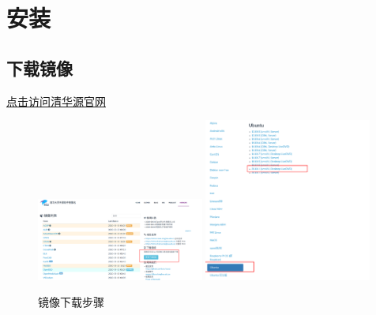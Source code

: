 \setcounter{page}{1} %
\chapter{安装}
\section{下载镜像} 
\href{https://mirrors.tuna.tsinghua.edu.cn/}{点击访问清华源官网}


\begin{figure}[hbt!] 
	\centering
	\includegraphics[width=0.49\textwidth]{./img/install/1.png}
	\includegraphics[width=0.49\textwidth]{./img/install/2.png}
	\caption{镜像下载步骤} %
	\label{fig:ubuntu_download} %
\end{figure}

  
